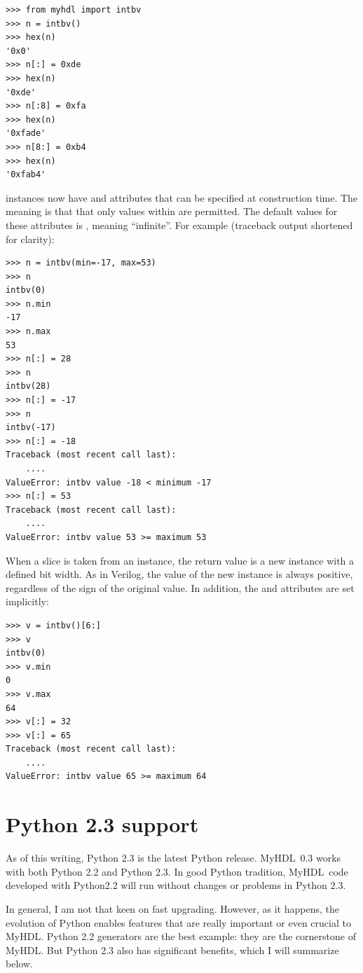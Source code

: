 \documentclass{howto}
\newcommand{\myhdl}{\protect \mbox{MyHDL}}
\begin{document}
\begin{verbatim}
>>> from myhdl import intbv
>>> n = intbv()
>>> hex(n)
'0x0'
>>> n[:] = 0xde
>>> hex(n)
'0xde'
>>> n[:8] = 0xfa
>>> hex(n)
'0xfade'
>>> n[8:] = 0xb4
>>> hex(n)
'0xfab4'
\end{verbatim}

 instances now have  and  attributes
that can be specified at construction time. The meaning is that that
only values within  are permitted. The default
values for these attributes is , meaning ``infinite''. For
example (traceback output shortened for clarity):

\begin{verbatim}
>>> n = intbv(min=-17, max=53)
>>> n
intbv(0)
>>> n.min
-17
>>> n.max
53
>>> n[:] = 28
>>> n
intbv(28)
>>> n[:] = -17
>>> n
intbv(-17)
>>> n[:] = -18
Traceback (most recent call last):
    ....
ValueError: intbv value -18 < minimum -17
>>> n[:] = 53
Traceback (most recent call last):
    ....
ValueError: intbv value 53 >= maximum 53
\end{verbatim}

When a slice is taken from an  instance, the return value
is a new  instance with a defined bit width. As in
Verilog, the value of the new  instance is always
positive, regardless of the sign of the original value. In addition,
the  and  attributes are set implicitly:

\begin{verbatim}
>>> v = intbv()[6:]
>>> v
intbv(0)
>>> v.min
0
>>> v.max
64
>>> v[:] = 32
>>> v[:] = 65
Traceback (most recent call last):
    ....
ValueError: intbv value 65 >= maximum 64
\end{verbatim}

\section{Python 2.3 support\label{section-Python}}

As of this writing, Python 2.3 is the latest Python release.  \myhdl\
0.3 works with both Python 2.2 and Python 2.3. In good Python
tradition, \myhdl\ code developed with Python2.2 will run without
changes or problems in Python 2.3.

In general, I am not that keen on fast upgrading. However, as it
happens, the evolution of Python enables features that are really
important or even crucial to \myhdl{}.  Python 2.2 generators are the
best example: they are the cornerstone of \myhdl{}. But Python 2.3
also has significant benefits, which I will summarize below.
\end{document}
